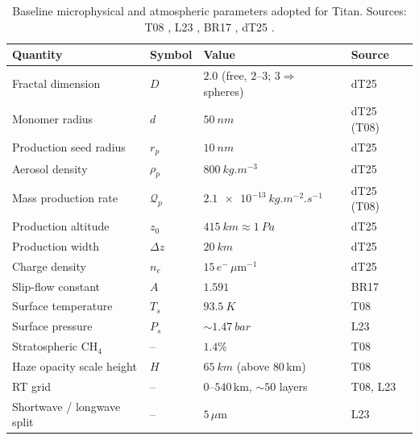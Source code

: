 \documentclass[11pt]{article}
\newcommand{\Df}{D}
\newcommand{\Qprod}{\mathcal{Q}_p}
\begin{document}
\begin{table}[t]
  \centering
  \caption{Baseline microphysical and atmospheric parameters adopted for Titan.
    Sources: T08 \citep{Tomasko2008heat}, L23 \citep{Lombardo2023},
    BR17 \citep{Burgalat2017}, dT25 \citep{deTrenquelleon2025}.}
  \label{tab:params}
  \begin{tabular}{llll}
    \toprule
    Quantity & Symbol & Value & Source \\
    \midrule
    Fractal dimension      & $\Df$    & $2.0$ (free, $2$--$3$; $3\Rightarrow$ spheres) & dT25 \\
    Monomer radius         & $d$      & $\SI{50}{nm}$            & dT25 (T08) \\
    Production seed radius  & $r_p$    & $\SI{10}{nm}$            & dT25 \\
    Aerosol density        & $\rho_p$ & $\SI{800}{kg.m^{-3}}$    & dT25 \\
    Mass production rate    & $\Qprod$ & $\SI{2.1e-13}{kg.m^{-2}.s^{-1}}$ & dT25 (T08) \\
    Production altitude     & $z_0$    & $\SI{415}{km}\approx\SI{1}{Pa}$ & dT25 \\
    Production width        & $\Delta z$ & $\SI{20}{km}$         & dT25 \\
    Charge density          & $n_e$    & $15\,e^-\,\mu\mathrm{m}^{-1}$ & dT25 \\
    Slip-flow constant      & $A$      & $1.591$                 & BR17 \\
    \midrule
    Surface temperature     & $T_s$    & $\SI{93.5}{K}$          & T08 \\
    Surface pressure        & $P_s$    & $\sim\!\SI{1.47}{bar}$  & L23 \\
    Stratospheric $\mathrm{CH_4}$ & --  & $1.4\%$                & T08 \\
    Haze opacity scale height & $H$    & $\SI{65}{km}$ (above $80\,$km) & T08 \\
    RT grid                 & --       & $0$--$540\,\mathrm{km}$, $\sim\!50$ layers & T08, L23 \\
    Shortwave / longwave split & --    & $5\,\mu\mathrm{m}$      & L23 \\
    \bottomrule
  \end{tabular}
\end{table}
\end{document}
